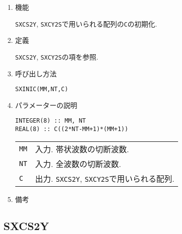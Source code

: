 \documentclass[a4j]{jsarticle}
\begin{document}
\begin{enumerate}

\item 機能 

\texttt{SXCS2Y}, \texttt{SXCY2S}で用いられる配列の\texttt{C}の初期化.

\item 定義

\texttt{SXCS2Y}, \texttt{SXCY2S}の項を参照.

\item 呼び出し方法 

\texttt{SXINIC(MM,NT,C)}
  
\item パラメーターの説明

\begin{verbatim}
INTEGER(8) :: MM, NT
REAL(8) :: C((2*NT-MM+1)*(MM+1))
\end{verbatim}

\begin{tabular}{ll}
\texttt{MM} & 入力. 帯状波数の切断波数.\\    
\texttt{NT} & 入力. 全波数の切断波数.\\
\texttt{C} & 出力. \texttt{SXCS2Y}, \texttt{SXCY2S}で用いられる配列.
\end{tabular}

\item 備考

\end{enumerate}


\subsection{SXCS2Y}
\end{document}
